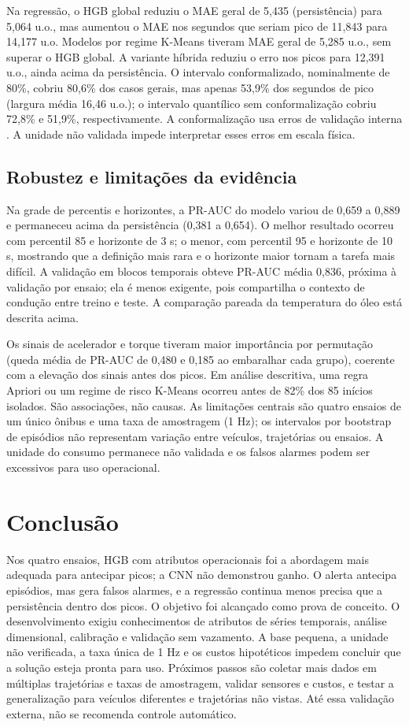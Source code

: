 \documentclass[10pt,a4paper]{article}
\begin{document}
Na regressão, o HGB global reduziu o MAE geral de 5{,}435 (persistência) para 5{,}064 u.o., mas aumentou o MAE nos segundos que seriam pico de 11{,}843 para 14{,}177 u.o. Modelos por regime K-Means tiveram MAE geral de 5{,}285 u.o., sem superar o HGB global. A variante híbrida reduziu o erro nos picos para 12{,}391 u.o., ainda acima da persistência. O intervalo conformalizado, nominalmente de 80\%, cobriu 80{,}6\% dos casos gerais, mas apenas 53{,}9\% dos segundos de pico (largura média 16{,}46 u.o.); o intervalo quantílico sem conformalização cobriu 72{,}8\% e 51{,}9\%, respectivamente. A conformalização usa erros de validação interna \cite{romano2019}. A unidade não validada impede interpretar esses erros em escala física.

\subsection{Robustez e limitações da evidência}
Na grade de percentis e horizontes, a PR-AUC do modelo variou de 0{,}659 a 0{,}889 e permaneceu acima da persistência (0{,}381 a 0{,}654). O melhor resultado ocorreu com percentil 85 e horizonte de 3 s; o menor, com percentil 95 e horizonte de 10 s, mostrando que a definição mais rara e o horizonte maior tornam a tarefa mais difícil. A validação em blocos temporais obteve PR-AUC média 0{,}836, próxima à validação por ensaio; ela é menos exigente, pois compartilha o contexto de condução entre treino e teste. A comparação pareada da temperatura do óleo está descrita acima.

Os sinais de acelerador e torque tiveram maior importância por permutação (queda média de PR-AUC de 0{,}480 e 0{,}185 ao embaralhar cada grupo), coerente com a elevação dos sinais antes dos picos. Em análise descritiva, uma regra Apriori ou um regime de risco K-Means ocorreu antes de 82\% dos 85 inícios isolados. São associações, não causas. As limitações centrais são quatro ensaios de um único ônibus e uma taxa de amostragem (1 Hz); os intervalos por bootstrap de episódios não representam variação entre veículos, trajetórias ou ensaios. A unidade do consumo permanece não validada e os falsos alarmes podem ser excessivos para uso operacional.

\section{Conclusão}
Nos quatro ensaios, HGB com atributos operacionais foi a abordagem mais adequada para antecipar picos; a CNN não demonstrou ganho. O alerta antecipa episódios, mas gera falsos alarmes, e a regressão continua menos precisa que a persistência dentro dos picos. O objetivo foi alcançado como prova de conceito. O desenvolvimento exigiu conhecimentos de atributos de séries temporais, análise dimensional, calibração e validação sem vazamento. A base pequena, a unidade não verificada, a taxa única de 1 Hz e os custos hipotéticos impedem concluir que a solução esteja pronta para uso. Próximos passos são coletar mais dados em múltiplas trajetórias e taxas de amostragem, validar sensores e custos, e testar a generalização para veículos diferentes e trajetórias não vistas. Até essa validação externa, não se recomenda controle automático.
\end{document}
